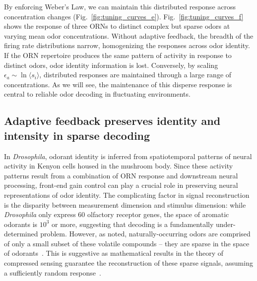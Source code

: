 By enforcing Weber's Law, we can maintain this distributed response across concentration changes (Fig.~\ref{fig:tuning_curves_e}). Fig.~\ref{fig:tuning_curves_f} shows the response of three ORNs to distinct complex but sparse odors at varying mean odor concentrations. Without adaptive feedback, the breadth of the firing rate distributions narrow, homogenizing the responses across odor identity. If the ORN repertoire produces the same pattern of activity in response to distinct odors, odor identity information is lost. Conversely, by scaling $\epsilon_a \sim \ln \langle s_i \rangle$, distributed responses are maintained through a large range of concentrations. As we will see, the maintenance of this disperse response is central to reliable odor decoding in fluctuating  environments. 






\subsection{Adaptive feedback preserves identity and intensity in sparse decoding}


In \textit{Drosophila}, odorant identity is inferred from spatiotemporal patterns of neural activity in Kenyon cells housed in the mushroom body. Since these activity patterns result from a combination of ORN response and downstream neural processing, front-end gain control can play a crucial role in preserving neural representations of odor identity. The complicating factor in signal reconstruction is the disparity between measurement dimension and stimulus dimension: while \textit{Drosophila} only express 60 olfactory receptor genes, the space of aromatic odorants is $10^3$ or more, suggesting that decoding is a fundamentally under-determined problem. However, as noted, naturally-occurring odors are comprised of only a small subset of these volatile compounds -- they are sparse in the space of odorants~\cite{vijay_1}. This is suggestive as mathematical results in the theory of compressed sensing guarantee the reconstruction of these sparse signals, assuming a sufficiently random response~\cite{CS_donoho, CS_tao, CS_ganguli}.



